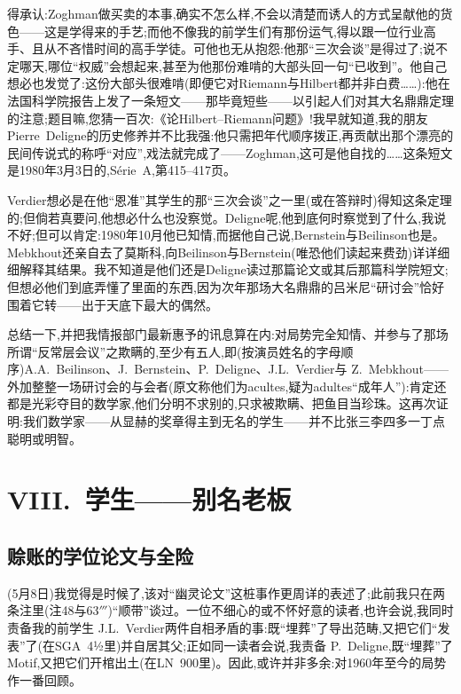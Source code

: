 得承认:Zoghman做买卖的本事,确实不怎么样,不会以清楚而诱人的方式呈献他的货色——这是学得来的手艺;而他不像我的前学生们有那份运气,得以跟一位行业高手、且从不吝惜时间的高手学徒。可他也无从抱怨:他那“三次会谈”是得过了;说不定哪天,哪位“权威”会想起来,甚至为他那份难啃的大部头回一句“已收到”。他自己想必也发觉了:这份大部头很难啃(即便它对Riemann与Hilbert都并非白费……):他在法国科学院报告上发了一条短文——那毕竟短些——以引起人们对其大名鼎鼎定理的注意;题目嘛,您猜一百次:《论Hilbert--Riemann问题》!我早就知道,我的朋友Pierre~Deligne的历史修养并不比我强:他只需把年代顺序拨正\dmark{},再贡献出那个漂亮的民间传说式的称呼“对应”,戏法就完成了——Zoghman,这可是他自找的……这条短文是1980年3月3日的,Série~A,第415--417页。

Verdier想必是在他“恩准”其学生的那“三次会谈”之一里(或在答辩时)得知这条定理的;但倘若真要问,他想必什么也没察觉。Deligne呢,他到底何时察觉到了什么,我说不好;但可以肯定:1980年10月他已知情,而据他自己说,Bernstein与Beilinson也是。Mebkhout还亲自去了莫斯科,向Beilinson与Bernstein(唯恐他们读起来费劲)详详细细解释其结果。我不知道是他们还是Deligne读过那篇论文或其后那篇科学院短文;但想必他们到底弄懂了里面的东西,因为次年那场大名鼎鼎的吕米尼“研讨会”恰好围着它转——出于天底下最大的偶然。

总结一下,并把我情报部门最新惠予的讯息算在内:对局势完全知情、并参与了那场所谓“反常层会议”之欺瞒的,至少有五人,即(按演员姓名的字母顺序)A.A.~Beilinson、J.~Bernstein、P.~Deligne、J.L.~Verdier与 Z.~Mebkhout——外加整整一场研讨会的与会者(原文称他们为acultes,疑为adultes“成年人”):肯定还都是光彩夺目的数学家,他们分明不求别的,只求被欺瞒、把鱼目当珍珠。这再次证明:我们数学家——从显赫的奖章得主到无名的学生——并不比张三李四多一丁点聪明或明智。

\section{VIII.~学生——别名老板}

\subsection{赊账的学位论文与全险}


\dmark{}(5月8日)我觉得是时候了,该对“幽灵论文”这桩事作更周详的表述了;此前我只在两条注里(注48与63$'''$)“顺带”谈过。一位不细心的或不怀好意的读者,也许会说,我同时责备我的前学生 J.L.~Verdier两件自相矛盾的事:既“埋葬”了导出范畴,又把它们“发表”了(在SGA~4½里)并自居其父;正如同一读者会说,我责备 P.~Deligne,既“埋葬”了Motif,又把它们开棺出土(在LN~900里)。因此,或许并非多余:对1960年至今的局势作一番回顾。

